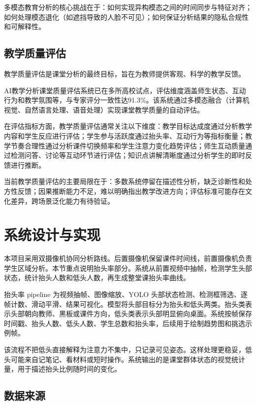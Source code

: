 \documentclass[12pt,hyperref,a4paper,UTF8]{ctexart}
\begin{document}
多模态教育分析的核心挑战在于：如何实现异构模态之间的时间同步与特征对齐；如何处理模态退化（如遮挡导致的人脸不可见）；如何保证分析结果的隐私合规性和可解释性。

\subsection{教学质量评估}

教学质量评估是课堂分析的最终目标，旨在为教师提供客观、科学的教学反馈。

AI教学分析课堂质量评估系统已在多所高校试点，评估维度涵盖师生状态、互动行为和教学氛围等，与专家评分一致性达91.3\%。该系统通过多模态融合（计算机视觉、自然语言处理、语音处理）实现课堂教学质量的自动评估。

在评估指标方面，教学质量评估通常关注以下维度：教学目标达成度通过分析教学内容和学生反应进行评估；学生参与活跃度通过抬头率、互动行为等指标衡量；教学节奏合理性通过分析课件切换频率和学生注意力变化趋势评估；师生互动质量通过检测问答、讨论等互动环节进行评估；知识点讲解清晰度通过分析学生的即时反馈进行推断。

当前教学质量评估的主要局限在于：多数系统停留在描述性分析，缺乏诊断性和处方性反馈；因果推断能力不足，难以明确指出教学改进方向；评估标准可能存在文化差异，跨场景泛化能力有待验证。


\section{系统设计与实现}
本项目采用双摄像机协同分析路线。后置摄像机保留课件时间线，前置摄像机负责学生区域分析。本节重点说明抬头率部分。系统从前置视频中抽帧，检测学生头部状态，统计抬头人数和低头人数，再生成整堂课抬头率曲线。

抬头率 pipeline 为视频抽帧、图像缩放、YOLO 头部状态检测、检测框筛选、逐帧计数、滑动平滑、结果可视化。模型将头部目标分为抬头和低头两类。抬头类表示头部朝向教师、黑板或课件方向，低头类表示头部明显俯向桌面。系统按帧保存时间戳、抬头人数、低头人数、学生总数和抬头率，后续用于绘制趋势图和挑选示例帧。

该流程不把低头直接解释为注意力不集中，只记录可见姿态。这样处理更稳妥，低头可能来自记笔记、看材料或短时操作。系统输出的是课堂群体状态的视觉统计量，用于描述抬头比例随时间的变化。


\subsection{数据来源}
\end{document}

